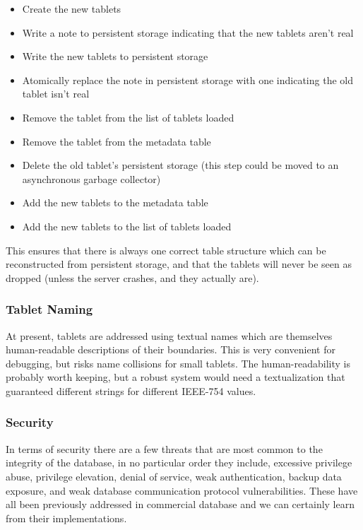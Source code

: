 \documentclass[11pt]{article}
\begin{document}
\begin{itemize}
\setlength\itemsep{0em}
\item Create the new tablets
\item Write a note to persistent storage indicating that the new tablets aren't real
\item Write the new tablets to persistent storage
\item Atomically replace the note in persistent storage with one indicating the old tablet isn't real
\item Remove the tablet from the list of tablets loaded
\item Remove the tablet from the metadata table
\item Delete the old tablet's persistent storage (this step could be moved to an asynchronous garbage collector)
\item Add the new tablets to the metadata table
\item Add the new tablets to the list of tablets loaded
\end{itemize}

This ensures that there is always one correct table structure which can be reconstructed from persistent storage, and that the tablets will never be seen as dropped (unless the server crashes, and they actually are).

\subsubsection{Tablet Naming}

At present, tablets are addressed using textual names which are themselves human-readable descriptions of their boundaries.  This is very convenient for debugging, but risks name collisions for small tablets.  The human-readability is probably worth keeping, but a robust system would need a textualization that guaranteed different strings for different IEEE-754 values.

\subsubsection{Security}

In terms of security there are a few threats that are most common to the integrity of the database, in no particular order they include, excessive privilege abuse, privilege elevation, denial of service, weak authentication, backup data exposure, and weak database communication protocol vulnerabilities\cite{security}. These have all been previously addressed in commercial database and we can certainly learn from their implementations. 
\end{document}
